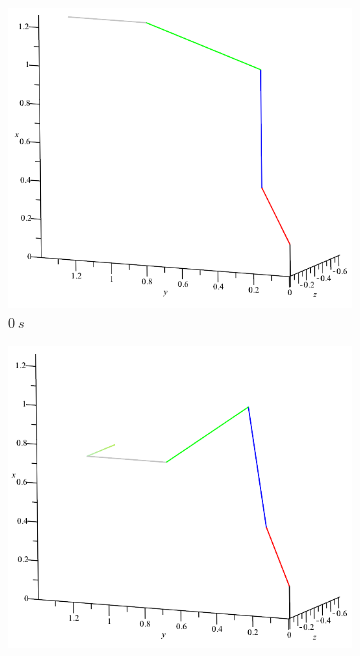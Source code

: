 \begin{figure}[h]
    \centering
    \begin{subfigure}[b]{0.4\textwidth}
        \includegraphics[width=\textwidth]{figs/mbs3D_0s}
        \caption{$0~s$}
        \label{fig::mbs3D_0s}
    \end{subfigure}
    \quad %
    \begin{subfigure}[b]{0.4\textwidth}
        \includegraphics[width=\textwidth]{figs/mbs3D_1s5}

\end{subfigure}
\end{figure}
